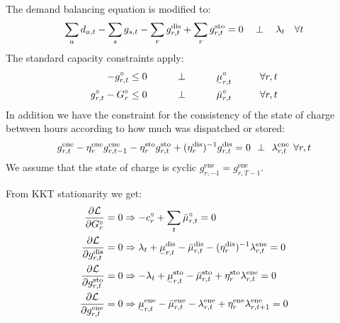 \documentclass[final,3p,times]{elsarticle}
\newcommand{\ubar}[1]{\text{\b{$#1$}}}
\def\l{\lambda}
\def\m{\mu}
\def\d{\partial}
\def\cL{\mathcal{L}}
\begin{document}
The demand balancing equation is modified to:
\begin{equation}
   \sum_a d_{a,t} - \sum_s g_{s,t} - \sum_r g^{\textrm{dis}}_{r,t}  + \sum_r g^{\textrm{sto}}_{r,t}  =  0 \hspace{0.34cm}\perp \hspace{0.34cm} \l_t \hspace{0.34cm} \forall t
\end{equation}
The standard capacity constraints apply:
\begin{align}
    -g^\circ_{r,t}\leq 0 \hspace{1cm}\perp \hspace{1cm} \ubar{\mu}^\circ_{r,t} \hspace{1cm} \forall r,t  \label{eq:storlower}\\
    g^\circ_{r,t} - G^\circ_r \leq 0 \hspace{1cm}\perp \hspace{1cm} \bar{\mu}^\circ_{r,t} \hspace{1cm} \forall r,t \label{eq:storupper}
\end{align}
In addition we have the constraint for the consistency of the state of charge between hours according to how much was dispatched or stored:
\begin{equation}
    g^{\textrm{ene}}_{r,t}- \eta^{\textrm{ene}}_r g^{\textrm{ene}}_{r,t-1} - \eta^{\textrm{sto}}_r g^{\textrm{sto}}_{r,t} + (\eta^{\textrm{dis}}_r)^{-1} g^{\textrm{dis}}_{r,t}  =  0 \hspace{0.14cm}\perp \hspace{0.14cm} \l^{\textrm{ene}}_{r,t} \hspace{0.14cm} \forall r,t  \label{eq:storsoc}
\end{equation}
We assume that the state of charge is cyclic $g^{\textrm{ene}}_{r,-1} = g^{\textrm{ene}}_{r,T-1}$.

From KKT stationarity we get:
\begin{align}
\frac{\d \cL}{\d G^\circ_{r}} = 0 &\Rightarrow - c^\circ_r + \sum_t \bar{\m}^\circ_{r,t}  = 0 \\
    \frac{\d \cL}{\d g^{\textrm{dis}}_{r,t}} = 0 &\Rightarrow  \l_t + \ubar{\m}^{\textrm{dis}}_{r,t} - \bar{\m}^{\textrm{dis}}_{r,t} - (\eta^{\textrm{dis}}_r)^{-1} \l^{\textrm{ene}}_{r,t}  = 0 \\
    \frac{\d \cL}{\d g^{\textrm{sto}}_{r,t}} = 0 &\Rightarrow  -\l_t + \ubar{\m}^{\textrm{sto}}_{r,t} - \bar{\m}^{\textrm{sto}}_{r,t} + \eta^{\textrm{sto}}_r \l^{\textrm{ene}}_{r,t}  = 0 \\
    \frac{\d \cL}{\d g^{\textrm{ene}}_{r,t}} = 0 &\Rightarrow   \ubar{\m}^{\textrm{ene}}_{r,t} - \bar{\m}^{\textrm{ene}}_{r,t} -  \l^{\textrm{ene}}_{r,t} + \eta^{\textrm{ene}}_r \l^{\textrm{ene}}_{r,t+1}   = 0
\end{align}
\end{document}
